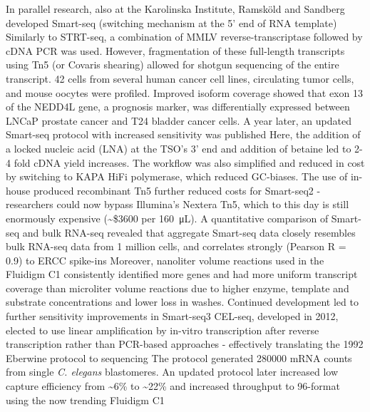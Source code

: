 In parallel research, also at the Karolinska Institute, Ramsk\"{o}ld and Sandberg developed Smart-seq (switching mechanism at the 5' end of RNA template) Similarly to STRT-seq, a combination of MMLV reverse-transcriptase followed by cDNA PCR was used. However, fragmentation of these full-length transcripts using Tn5 (or Covaris shearing) allowed for shotgun sequencing of the entire transcript. 42 cells from several human cancer cell lines, circulating tumor cells, and mouse oocytes were profiled. Improved isoform coverage showed that exon 13 of the NEDD4L gene, a prognosis marker, was differentially expressed between LNCaP prostate cancer and T24 bladder cancer cells. A year later, an updated Smart-seq protocol with increased sensitivity was published Here, the addition of a locked nucleic acid (LNA) at the TSO's 3' end and addition of betaine led to 2-4 fold cDNA yield increases. The workflow was also simplified and reduced in cost by switching to KAPA HiFi polymerase, which reduced GC-biases. The use of in-house produced recombinant Tn5 further reduced costs for Smart-seq2 - researchers could now bypass Illumina's Nextera Tn5, which to this day is still enormously expensive (\textasciitilde\$\num{3600} per \SI{160}{\micro\liter}). A quantitative comparison of Smart-seq and bulk RNA-seq revealed that aggregate Smart-seq data closely resembles bulk RNA-seq data from 1 million cells, and correlates strongly (Pearson R = 0.9) to ERCC spike-ins Moreover, nanoliter volume reactions used in the Fluidigm C1 consistently identified more genes and had more uniform transcript coverage than microliter volume reactions due to higher enzyme, template and substrate concentrations and lower loss in washes. Continued development led to further sensitivity improvements in Smart-seq3 CEL-seq, developed in 2012, elected to use linear amplification by in-vitro transcription after reverse transcription rather than PCR-based approaches - effectively translating the 1992 Eberwine protocol to sequencing The protocol generated \num{280000} mRNA counts from single \textit{C. elegans} blastomeres. An updated protocol later increased low capture efficiency from \textasciitilde{6}\% to \textasciitilde{22}\% and increased throughput to 96-format using the now trending Fluidigm C1

